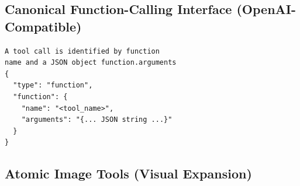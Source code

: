 \documentclass[runningheads]{llncs}
\theoremstyle{plain}
\theoremstyle{definition}
\theoremstyle{remark}
\begin{document}
\subsection{Canonical Function-Calling Interface (OpenAI-Compatible)} 

\begin{tcolorbox}[ 
    enhanced, 
    breakable, 
    colframe=black!70, 
    colback=yellow!5, 
    boxrule=1pt, arc=4mm, 
    left=2mm, right=2mm, top=1mm, bottom=1mm, 
    before=\needspace{8\baselineskip}, 
    title={Example tool call payload (OpenAI-compatible wrapper)} 
] 
\begin{verbatim}
A tool call is identified by function 
name and a JSON object function.arguments
{ 
  "type": "function", 
  "function": { 
    "name": "<tool_name>", 
    "arguments": "{... JSON string ...}" 
  } 
} 
\end{verbatim}
\end{tcolorbox} 


\subsection{Atomic Image Tools (Visual Expansion)} 
\end{document}
